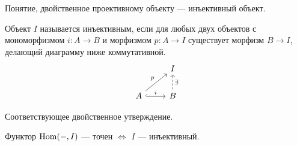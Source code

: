 \documentclass[../main.tex]{subfiles}
\begin{document}
Понятие, двойственное проективному объекту --- инъективный объект.
\begin{to_def}\label{injective_def}
Объект $I$ называется инъективным, если для любых двух объектов с мономорфизмом $i:A\to B$ и морфизмом $p:A\to I$ существует морфизм $B\to I$, делающий диаграмму ниже коммутативной.
\begin{equation}\label{injective_def_diagram}
\begin{tikzcd}
	& I \\
	A & B
	\arrow["i", hook, from=2-1, to=2-2]
	\arrow["p", from=2-1, to=1-2]
	\arrow["\exists"', dashed, from=2-2, to=1-2]
\end{tikzcd}
\end{equation}
\end{to_def}
Соответствующее двойственное утверждение.
\begin{to_suj}
Функтор $\operatorname{Hom}(-, I)$ --- точен $\iff$ $I$ --- инъективный.
\end{to_suj}
\end{document}
